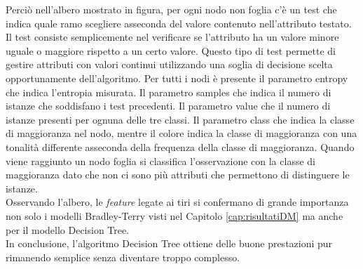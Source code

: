 Perciò nell'albero mostrato in figura, per ogni nodo non foglia c'è un test che indica quale ramo scegliere asseconda del valore contenuto nell'attributo testato. Il test consiste semplicemente nel verificare se l'attributo ha un valore minore uguale o maggiore rispetto a un certo valore. Questo tipo di test permette di gestire attributi con valori continui utilizzando una soglia di decisione scelta opportunamente dell'algoritmo. Per tutti i nodi è presente il parametro \textsf{entropy} che indica l'entropia misurata. Il parametro \textsf{samples} che indica il numero di istanze che soddisfano i test precedenti. Il parametro \textsf{value} che il numero di istanze presenti per ognuna delle tre classi. Il parametro \textsf{class} che indica la classe di maggioranza nel nodo, mentre il colore indica la classe di maggioranza con una tonalità differente asseconda della frequenza della classe di maggioranza. Quando viene raggiunto un nodo foglia si classifica l'osservazione con la classe di maggioranza dato che non ci sono più attributi che permettono di distinguere le istanze.\\
Osservando l'albero, le \emph{feature} legate ai tiri si confermano di grande importanza non solo i modelli Bradley-Terry visti nel Capitolo \ref{cap:risultatiDM} ma anche per il modello Decision Tree.\\
In conclusione, l'algoritmo Decision Tree ottiene delle buone prestazioni pur rimanendo semplice senza diventare troppo complesso.

